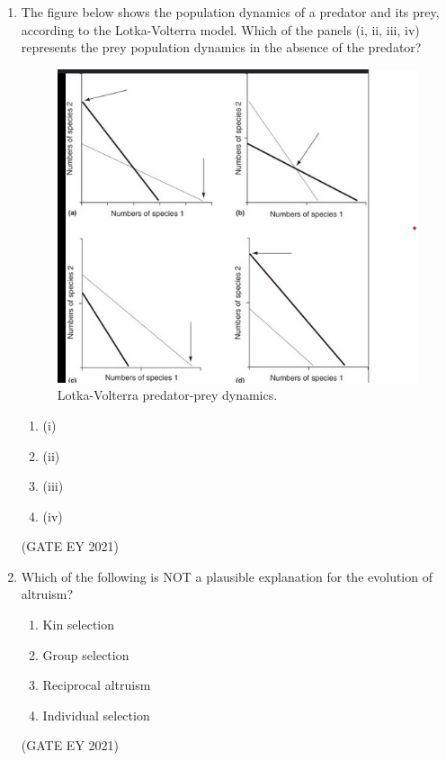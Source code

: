 \documentclass[journal]{IEEEtran}
\begin{document}
\begin{enumerate}
    \item The figure below shows the population dynamics of a predator and its prey, according to the Lotka-Volterra model. Which of the panels (i, ii, iii, iv) represents the prey population dynamics in the absence of the predator?
    \begin{figure}[!h]
        \centering
        \includegraphics[width=0.6\columnwidth]{figs/Q.33.png}
        \caption{Lotka-Volterra predator-prey dynamics.}
        \label{Q.33}
    \end{figure}
    \begin{multicols}{4}
    \begin{enumerate}
        \item (i)
        \item (ii)
        \item (iii)
        \item (iv)
    \end{enumerate}
    \end{multicols}
    \hfill{(GATE EY 2021)}

    \item Which of the following is NOT a plausible explanation for the evolution of altruism?
    \begin{multicols}{2}
    \begin{enumerate}
        \item Kin selection
        \item Group selection
        \item Reciprocal altruism
        \item Individual selection
    \end{enumerate}
    \end{multicols}
    \hfill{(GATE EY 2021)}


\end{enumerate}
\end{document}
